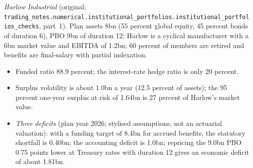 \begin{qfmethod}
 \emph{Harlow Industrial} (original; \nolinkurl{trading_notes.numerical.institutional_portfolios.institutional_portfolios_checks}, part~1). Plan assets 8bn (55 percent global equity, 45 percent bonds of duration 6), PBO 9bn of duration 12; Harlow is a cyclical manufacturer with a 6bn market value and EBITDA of 1.2bn; 60 percent of members are retired and benefits are final-salary with partial indexation.
\begin{itemize}
\item Funded ratio 88.9 percent; the interest-rate hedge ratio is only 20 percent.
\item Surplus volatility is about 1.0bn a year (12.5 percent of assets); the 95 percent one-year surplus at risk of 1.64bn is 27 percent of Harlow's market value.
\item \emph{Three deficits} (plan year 2026; stylised assumptions, not an actuarial valuation): with a funding target of 8.4bn for accrued benefits, the statutory shortfall is 0.40bn; the accounting deficit is 1.0bn; repricing the 9.0bn PBO 0.75 points lower at Treasury rates with duration 12 gives an economic deficit of about 1.81bn.

\end{itemize}
\end{qfmethod}
